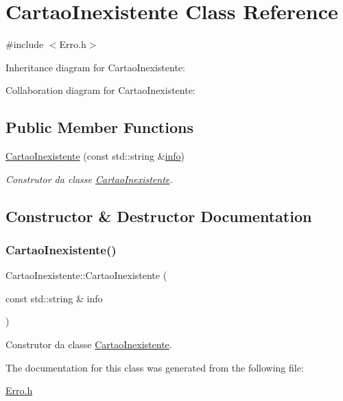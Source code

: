 \hypertarget{class_cartao_inexistente}{}\section{Cartao\+Inexistente Class Reference}
\label{class_cartao_inexistente}


{\ttfamily \#include $<$Erro.\+h$>$}



Inheritance diagram for Cartao\+Inexistente\+:


Collaboration diagram for Cartao\+Inexistente\+:
\subsection*{Public Member Functions}
\begin{DoxyCompactItemize}
\item 
\mbox{\hyperlink{class_cartao_inexistente_a48a83d627aabc141aa1bb7216c74918b}{Cartao\+Inexistente}} (const std\+::string \&\mbox{\hyperlink{class_erro_a3ecaaf6f8e15a0830a648035b456cb62}{info}})
\begin{DoxyCompactList}\small\item\em Construtor da classe \mbox{\hyperlink{class_cartao_inexistente}{Cartao\+Inexistente}}. \end{DoxyCompactList}\end{DoxyCompactItemize}


\subsection{Constructor \& Destructor Documentation}
\mbox{\label{class_cartao_inexistente_a48a83d627aabc141aa1bb7216c74918b}} 
\subsubsection{\texorpdfstring{Cartao\+Inexistente()}{CartaoInexistente()}}
{\footnotesize\ttfamily Cartao\+Inexistente\+::\+Cartao\+Inexistente (\begin{DoxyParamCaption}\item[{const std\+::string \&}]{info }\end{DoxyParamCaption})\hspace{0.3cm}{\ttfamily [inline]}}



Construtor da classe \mbox{\hyperlink{class_cartao_inexistente}{Cartao\+Inexistente}}. 



The documentation for this class was generated from the following file\+:\begin{DoxyCompactItemize}
\item 
\mbox{\hyperlink{_erro_8h}{Erro.\+h}}\end{DoxyCompactItemize}

